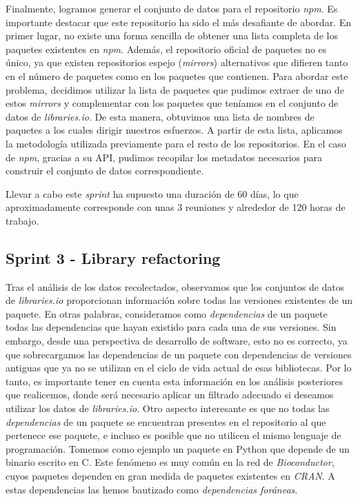 Finalmente, logramos generar el conjunto de datos para el repositorio \textit{npm}. Es importante destacar que este 
repositorio ha sido el más desafiante de abordar. En primer lugar, no existe una forma sencilla de obtener una lista 
completa de los paquetes existentes en \textit{npm}. Además, el repositorio oficial de paquetes no es único, ya que 
existen repositorios espejo (\textit{mirrors}) alternativos que difieren tanto en el número de paquetes como en los 
paquetes que contienen. Para abordar este problema, decidimos utilizar la lista de paquetes que pudimos extraer de 
uno de estos \textit{mirrors} y complementar con los paquetes que teníamos en el conjunto de datos de \textit{libraries.io}. 
De esta manera, obtuvimos una lista de nombres de paquetes a los cuales dirigir nuestros esfuerzos. A partir de esta 
lista, aplicamos la metodología utilizada previamente para el resto de los repositorios. En el caso de \textit{npm}, 
gracias a su API, pudimos recopilar los metadatos necesarios para construir el conjunto de datos correspondiente.

Llevar a cabo este \textit{sprint} ha supuesto una duración de 60 días, lo que aproximadamente corresponde con unas 
3 reuniones y alrededor de 120 horas de trabajo.


\subsection{Sprint 3 - Library refactoring}

Tras el análisis de los datos recolectados, observamos que los conjuntos de datos de \textit{libraries.io} proporcionan 
información sobre todas las versiones existentes de un paquete. En otras palabras, consideramos como \textit{dependencias} 
de un paquete todas las dependencias que hayan existido para cada una de sus versiones. Sin embargo, desde una perspectiva 
de desarrollo de software, esto no es correcto, ya que sobrecargamos las dependencias de un paquete con dependencias de 
versiones antiguas que ya no se utilizan en el ciclo de vida actual de esas bibliotecas. Por lo tanto, es importante tener 
en cuenta esta información en los análisis posteriores que realicemos, donde será necesario aplicar un filtrado adecuado 
si deseamos utilizar los datos de \textit{libraries.io}.
Otro aspecto interesante es que no todas las \textit{dependencias} de un paquete se encuentran presentes en el repositorio 
al que pertenece ese paquete, e incluso es posible que no utilicen el mismo lenguaje de programación. Tomemos como ejemplo 
un paquete en Python que depende de un binario escrito en C. Este fenómeno es muy común en la red de \textit{Bioconductor}, 
cuyos paquetes dependen en gran medida de paquetes existentes en \textit{CRAN}. 
A estas dependencias las hemos bautizado como \textit{dependencias foráneas}.

